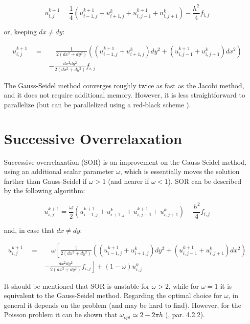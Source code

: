 \documentclass[11pt]{report}
\begin{document}
\begin{equation}
u_{i,j}^{k+1} = \frac{1}{4} \left(  u_{i-1, j}^{k+1} + u_{i+1, j}^k + u_{i, j-1}^{k+1} + u_{i, j+1}^k  \right) - \frac{h^2}{4}f_{i,j}
\end{equation}

or, keeping $dx \neq dy$:

\begin{equation}
\begin{split}
u_{i,j}^{k+1} \quad = & \quad \frac{1}{2(dx^2 + dy^2)} \left(  (u_{i-1, j}^{k+1} + u_{i+1, j}^k)dy^2 + (u_{i, j-1}^{k+1} + u_{i, j+1}^k)dx^2  \right) \\
 & - \frac{dx^2 dy^2}{2(dx^2+dy^2)}f_{i,j}
\end{split}
\end{equation}

The Gauss-Seidel method converges roughly twice as fast as the Jacobi method, and it does not require additional memory. However, it is less straightforward to parallelize (but can be parallelized using a red-black scheme \cite{karniadakis}).

\section{Successive Overrelaxation}
Successive overrelaxation (SOR) is an improvement on the Gauss-Seidel method, using an additional scalar parameter $\omega$, which is essentially moves the solution farther than Gauss-Seidel if $\omega > 1$ (and nearer if $\omega < 1$). SOR can be described by the following algorithm:

\begin{equation}
u_{i,j}^{k+1} = \frac{\omega}{2} \left(  u_{i-1, j}^{k+1} + u_{i+1, j}^k + u_{i, j-1}^{k+1} + u_{i, j+1}^k  \right) - \frac{h^2}{4}f_{i,j}
\end{equation}

and, in case that $dx \neq dy$:

\begin{equation}
\begin{split}
u_{i,j}^{k+1} \quad = & \quad \omega \left[ \frac{1}{2(dx^2 + dy^2)} 
\left(  (u_{i-1, j}^{k+1} + u_{i+1, j}^k)dy^2 + (u_{i, j-1}^{k+1} + u_{i, j+1}^k)dx^2  \right) \right.\\
& \left. - \frac{dx^2 dy^2}{2(dx^2+dy^2)}f_{i,j} \right] + (1 - \omega) u_{i,j}^k
\end{split}
\end{equation}

It should be mentioned that SOR is unstable for $\omega > 2$, while for $\omega = 1$ it is equivalent to the Gauss-Seidel method. Regarding the optimal choice for $\omega$, in general it depends on the problem (and may be hard to find). However, for the Poisson problem it can be shown that $\omega_{opt} \simeq 2 - 2 \pi h$ (\cite{leveque}, par. 4.2.2).
\end{document}
